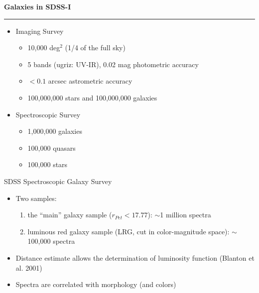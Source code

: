 \documentclass[letterpaper,landscape]{slides}
\begin{document}
\begin{slide}

\begin{center}
\bfseries
{\color{red} \large Galaxies in SDSS-I}
\end{center}
 \vskip 0.2in
\hrule

\begin{itemize}
\item
{\color{red}Imaging Survey}
   \begin{itemize}
   \item 10,000 deg$^2$ (1/4 of the full sky)
   \item 5 bands (ugriz: UV-IR), 0.02 mag photometric accuracy
   \item $<0.1$ arcsec astrometric accuracy
   \item 100,000,000 stars and 100,000,000 galaxies
   \end{itemize}

\item
{\color{red}Spectroscopic Survey}
   \begin{itemize}
   \item 1,000,000 galaxies
   \item 100,000 quasars
   \item 100,000 stars
   \end{itemize}

\end{itemize}
\end{slide}
 




\begin{slide}
\begin{center}
{\large \color{red} SDSS Spectroscopic Galaxy Survey }
\end{center}

\begin{itemize}
\item
{\color{blue} Two samples:} 
\begin{enumerate} 
\item the ``main'' galaxy sample ($r_{Pet}<17.77$): $\sim$1 million spectra
\item luminous red galaxy sample (LRG, cut in color-magnitude space): $\sim$100,000 spectra
\end{enumerate}  
\item
Distance estimate allows the determination of luminosity function (Blanton
et al. 2001)
\item Spectra are correlated with morphology (and colors)
\end{itemize}  

\vfill
\end{slide}
\end{document}
